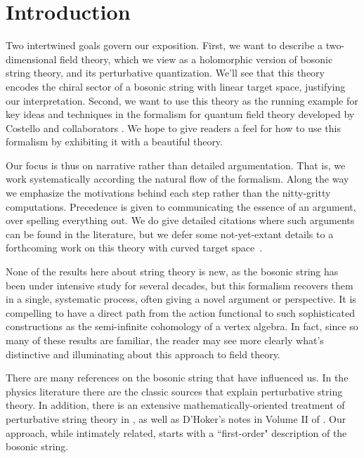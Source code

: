 
\section{Introduction}


Two intertwined goals govern our exposition.
First, we want to describe a two-dimensional field theory,
which we view as a holomorphic version of bosonic string theory,
and its perturbative quantization.
We'll see that this theory encodes the chiral sector of a bosonic string with linear target space,
justifying our interpretation.
Second, we want to use this theory as the running example for key ideas and techniques in the formalism for quantum field theory developed by Costello and collaborators \cite{CosBook, CG1,CG2, LL1, GG1, GLL, LiVA}.
We hope to give readers a feel for how to use this formalism by exhibiting it with a beautiful theory.

Our focus is thus on narrative rather than detailed argumentation.
That is, we work systematically according the natural flow of the formalism. 
Along the way we emphasize the motivations behind each step rather than the nitty-gritty computations. 
Precedence is given to communicating the essence of an argument, over spelling everything out.
We do give detailed citations where such arguments can be found in the literature,
but we defer some not-yet-extant details to a forthcoming work on this theory with curved target space~\cite{GWcurved}.

None of the results here about string theory is new, 
as the bosonic string has been under intensive study for several decades,
but this formalism recovers them in a single, systematic process,
often giving a novel argument or perspective.
It is compelling to have a direct path from the action functional to such sophisticated constructions as the semi-infinite cohomology of a vertex algebra.
In fact, since so many of these results are familiar,
the reader may see more clearly what's distinctive and illuminating about this approach to field theory.

There are many references on the bosonic string that have influenced us.
In the physics literature there are the classic sources \cite{GSW1, GSW2, polchinski} that explain perturbative string theory. 
In addition, there is an extensive mathematically-oriented treatment of perturbative string theory in \cite{DP}, as well as D'Hoker's notes in Volume II of \cite{IAScourse}.
Our approach, while intimately related, starts with a ``first-order" description of the bosonic string. 

